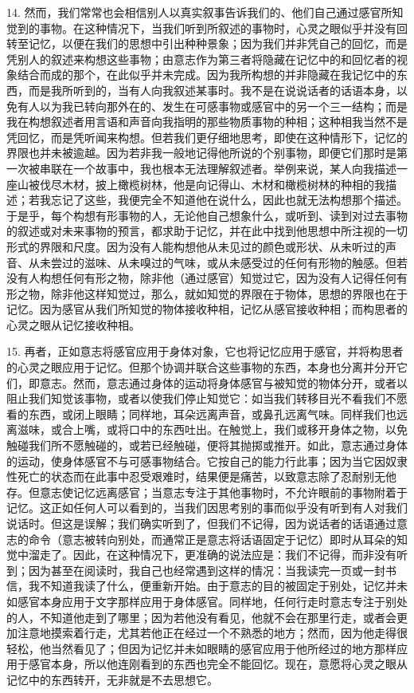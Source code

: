 14. 然而，我们常常也会相信别人以真实叙事告诉我们的、他们自己通过感官所知觉到的事物。在这种情况下，当我们听到所叙述的事物时，心灵之眼似乎并没有回转至记忆，以便在我们的思想中引出种种景象；因为我们并非凭自己的回忆，而是凭别人的叙述来构想这些事物；由意志作为第三者将隐藏在记忆中的和回忆者的视象结合而成的那个，在此似乎并未完成。因为我所构想的并非隐藏在我记忆中的东西，而是我所听到的，当有人向我叙述某事时。我不是在说说话者的话语本身，以免有人以为我已转向那外在的、发生在可感事物或感官中的另一个三一结构；而是我在构想叙述者用言语和声音向我指明的那些物质事物的种相；这种相我当然不是凭回忆，而是凭听闻来构想。但若我们更仔细地思考，即使在这种情形下，记忆的界限也并未被逾越。因为若非我一般地记得他所说的个别事物，即便它们那时是第一次被串联在一个故事中，我也根本无法理解叙述者。举例来说，某人向我描述一座山被伐尽木材，披上橄榄树林，他是向记得山、木材和橄榄树林的种相的我描述；若我忘记了这些，我便完全不知道他在说什么，因此也就无法构想那个描述。于是乎，每个构想有形事物的人，无论他自己想象什么，或听到、读到对过去事物的叙述或对未来事物的预言，都求助于记忆，并在此中找到他思想中所注视的一切形式的界限和尺度。因为没有人能构想他从未见过的颜色或形状、从未听过的声音、从未尝过的滋味、从未嗅过的气味，或从未感受过的任何有形物的触感。但若没有人构想任何有形之物，除非他（通过感官）知觉过它，因为没有人记得任何有形之物，除非他这样知觉过，那么，就如知觉的界限在于物体，思想的界限也在于记忆。因为感官从我们所知觉的物体接收种相，记忆从感官接收种相；而构思者的心灵之眼从记忆接收种相。\par

15. 再者，正如意志将感官应用于身体对象，它也将记忆应用于感官，并将构思者的心灵之眼应用于记忆。但那个协调并联合这些事物的东西，本身也分离并分开它们，即意志。然而，意志通过身体的运动将身体感官与被知觉的物体分开，或者以阻止我们知觉该事物，或者以使我们停止知觉它：如当我们转移目光不看我们不愿看的东西，或闭上眼睛；同样地，耳朵远离声音，或鼻孔远离气味。同样我们也远离滋味，或合上嘴，或将口中的东西吐出。在触觉上，我们或移开身体之物，以免触碰我们所不愿触碰的，或若已经触碰，便将其抛掷或推开。如此，意志通过身体的运动，使身体感官不与可感事物结合。它按自己的能力行此事；因为当它因奴隶性死亡的状态而在此事中忍受艰难时，结果便是痛苦，以致意志除了忍耐别无他存。但意志使记忆远离感官；当意志专注于其他事物时，不允许眼前的事物附着于记忆。这正如任何人可以看到的，当我们因思考别的事而似乎没有听到有人对我们说话时。但这是误解；我们确实听到了，但我们不记得，因为说话者的话语通过意志的命令（意志被转向别处，而通常正是意志将话语固定于记忆）即时从耳朵的知觉中溜走了。因此，在这种情况下，更准确的说法应是：我们不记得，而非没有听到；因为甚至在阅读时，我自己也经常遇到这样的情况：当我读完一页或一封书信，我不知道我读了什么，便重新开始。由于意志的目的被固定于别处，记忆并未如感官本身应用于文字那样应用于身体感官。同样地，任何行走时意志专注于别处的人，不知道他走到了哪里；因为若他没有看见，他就不会在那里行走，或者会更加注意地摸索着行走，尤其若他正在经过一个不熟悉的地方；然而，因为他走得很轻松，他当然看见了；但因为记忆并未如眼睛的感官应用于他所经过的地方那样应用于感官本身，所以他连刚看到的东西也完全不能回忆。现在，意愿将心灵之眼从记忆中的东西转开，无非就是不去思想它。\par

